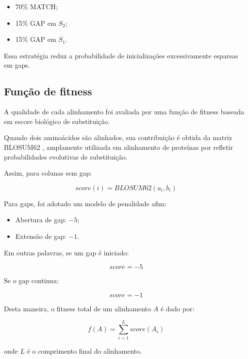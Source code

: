 \documentclass[12pt]{article}
\begin{document}
\begin{itemize}
    \item 70\% MATCH;
    \item 15\% GAP em $S_2$;
    \item 15\% GAP em $S_1$.
\end{itemize}

Essa estratégia reduz a probabilidade de inicializações excessivamente esparsas em gaps.

\subsection{Função de fitness}

A qualidade de cada alinhamento foi avaliada por uma função de fitness baseada em escore biológico de substituição.

Quando dois aminoácidos são alinhados, sua contribuição é obtida da matriz BLOSUM62 \cite{blosum62}, amplamente utilizada em alinhamento de proteínas por refletir probabilidades evolutivas de substituição.

Assim, para colunas sem gap:

\begin{equation}
    score(i) = BLOSUM62(a_i, b_i)
\end{equation}

Para gaps, foi adotado um modelo de penalidade afim:

\begin{itemize}
    \item Abertura de gap: $-5$;
    \item Extensão de gap: $-1$.
\end{itemize}

Em outras palavras, se um gap é iniciado:

\begin{equation}
    score = -5
\end{equation}

Se o gap continua:

\begin{equation}
    score = -1
\end{equation}

Desta maneira, o fitness total de um alinhamento $A$ é dado por:

\begin{equation}
    f(A)=\sum_{i=1}^{L} score(A_i)
\end{equation}

onde $L$ é o comprimento final do alinhamento.
\end{document}
